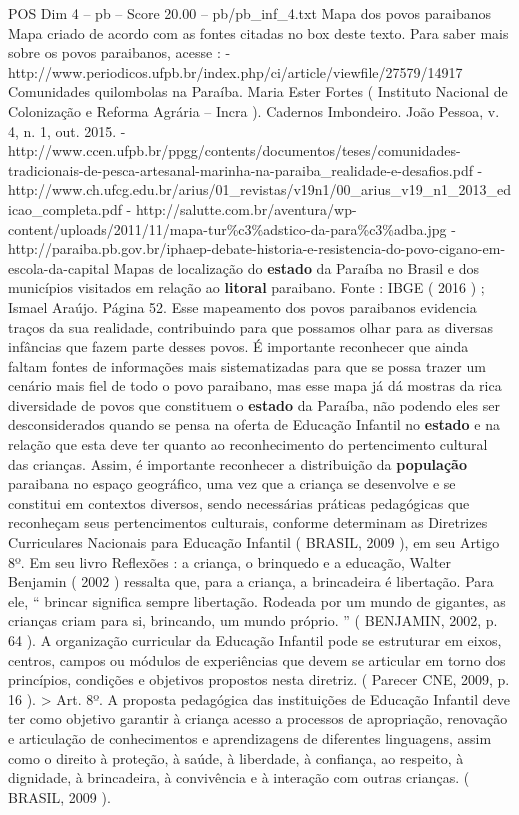 \begin{textsample}{POS Dim 4 – pb – Score 20.00 – pb/pb\_inf\_4.txt}
Mapa dos povos paraibanos Mapa criado de acordo com as fontes citadas no box deste texto.
Para saber mais sobre os povos paraibanos, acesse : - http://www.periodicos.ufpb.br/index.php/ci/article/viewfile/27579/14917 Comunidades quilombolas na Paraíba.
Maria Ester Fortes ( Instituto Nacional de Colonização e Reforma Agrária – Incra ).
Cadernos Imbondeiro.
João Pessoa, v. 4, n. 1, out. 2015. - http://www.ccen.ufpb.br/ppgg/contents/documentos/teses/comunidades-tradicionais-de-pesca-artesanal-marinha-na-paraiba\_realidade-e-desafios.pdf - http://www.ch.ufcg.edu.br/arius/01\_revistas/v19n1/00\_arius\_v19\_n1\_2013\_edicao\_completa.pdf - http://salutte.com.br/aventura/wp-content/uploads/2011/11/mapa-tur\%c3\%adstico-da-para\%c3\%adba.jpg - http://paraiba.pb.gov.br/iphaep-debate-historia-e-resistencia-do-povo-cigano-em-escola-da-capital Mapas de localização do \textbf{estado} da Paraíba no Brasil e dos municípios visitados em relação ao \textbf{litoral} paraibano.
Fonte : IBGE ( 2016 ) ; Ismael Araújo.
Página 52.
Esse mapeamento dos povos paraibanos evidencia traços da sua realidade, contribuindo para que possamos olhar para as diversas infâncias que fazem parte desses povos.
É importante reconhecer que ainda faltam fontes de informações mais sistematizadas para que se possa trazer um cenário mais fiel de todo o povo paraibano, mas esse mapa já dá mostras da rica diversidade de povos que constituem o \textbf{estado} da Paraíba, não podendo eles ser desconsiderados quando se pensa na oferta de Educação Infantil no \textbf{estado} e na relação que esta deve ter quanto ao reconhecimento do pertencimento cultural das crianças.
Assim, é importante reconhecer a distribuição da \textbf{população} paraibana no espaço geográfico, uma vez que a criança se desenvolve e se constitui em contextos diversos, sendo necessárias práticas pedagógicas que reconheçam seus pertencimentos culturais, conforme determinam as Diretrizes Curriculares Nacionais para Educação Infantil ( BRASIL, 2009 ), em seu Artigo 8º.
Em seu livro Reflexões : a criança, o brinquedo e a educação, Walter Benjamin ( 2002 ) ressalta que, para a criança, a brincadeira é libertação.
Para ele, “ brincar significa sempre libertação.
Rodeada por um mundo de gigantes, as crianças criam para si, brincando, um mundo próprio. ” ( BENJAMIN, 2002, p. 64 ).
A organização curricular da Educação Infantil pode se estruturar em eixos, centros, campos ou módulos de experiências que devem se articular em torno dos princípios, condições e objetivos propostos nesta diretriz. ( Parecer CNE, 2009, p. 16 ). > Art. 8º.
A proposta pedagógica das instituições de Educação Infantil deve ter como objetivo garantir à criança acesso a processos de apropriação, renovação e articulação de conhecimentos e aprendizagens de diferentes linguagens, assim como o direito à proteção, à saúde, à liberdade, à confiança, ao respeito, à dignidade, à brincadeira, à convivência e à interação com outras crianças. ( BRASIL, 2009 ).

\end{textsample}
